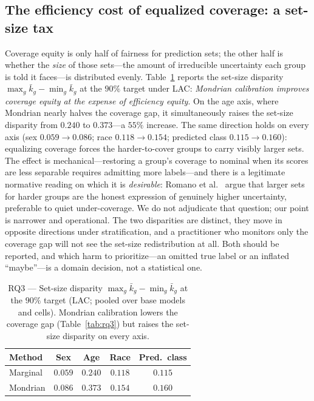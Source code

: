 \documentclass[review,12pt]{elsarticle}
\begin{document}
\subsection{The efficiency cost of equalized coverage: a set-size tax}
\label{sec:rq3tax}
Coverage equity is only half of fairness for prediction sets; the other half is whether the \emph{size} of those sets---the amount of irreducible uncertainty each group is told it faces---is distributed evenly. Table~\ref{tab:tax} reports the set-size disparity $\max_g \bar k_g - \min_g \bar k_g$ at the $90\%$ target under LAC: \emph{Mondrian calibration improves coverage equity at the expense of efficiency equity}. On the age axis, where Mondrian nearly halves the coverage gap, it simultaneously raises the set-size disparity from $0.240$ to $0.373$---a $55\%$ increase. The same direction holds on every axis (sex $0.059\!\to\!0.086$; race $0.118\!\to\!0.154$; predicted class $0.115\!\to\!0.160$): equalizing coverage forces the harder-to-cover groups to carry visibly larger sets. The effect is mechanical---restoring a group's coverage to nominal when its scores are less separable requires admitting more labels---and there is a legitimate normative reading on which it is \emph{desirable}: Romano et al.\ \cite{romano2020eq} argue that larger sets for harder groups are the honest expression of genuinely higher uncertainty, preferable to quiet under-coverage. We do not adjudicate that question; our point is narrower and operational. The two disparities are distinct, they move in opposite directions under stratification, and a practitioner who monitors only the coverage gap will not see the set-size redistribution at all. Both should be reported, and which harm to prioritize---an omitted true label or an inflated ``maybe''---is a domain decision, not a statistical one.

\begin{table}[t]
\centering
\caption{RQ3 --- Set-size disparity $\max_g \bar k_g - \min_g \bar k_g$ at the $90\%$ target (LAC; pooled over base models and cells). Mondrian calibration lowers the coverage gap (Table~\ref{tab:rq3}) but raises the set-size disparity on every axis.}
\label{tab:tax}
\small
\begin{tabular}{lcccc}
\toprule
Method & Sex & Age & Race & Pred.\ class \\
\midrule
Marginal & $0.059$ & $0.240$ & $0.118$ & $0.115$ \\
Mondrian & $0.086$ & $0.373$ & $0.154$ & $0.160$ \\
\bottomrule
\end{tabular}
\end{table}
\end{document}
